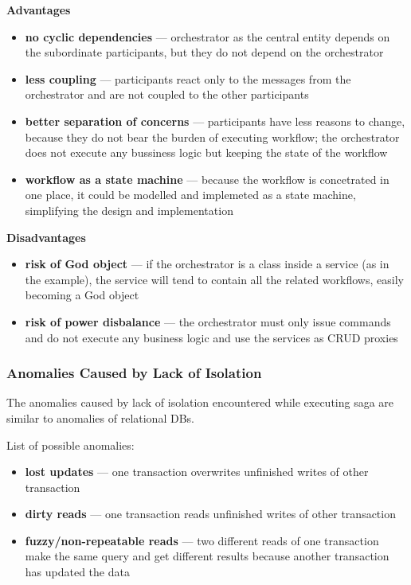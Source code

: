 \documentclass[thesis=M,english,hidelinks]{FITthesis}[2012/10/20]
\begin{document}
\vspace{1em}
\noindent
\textbf{Advantages}
\begin{itemize}
    \item \textbf{no cyclic dependencies} --- orchestrator as the central entity depends on the subordinate participants, but they do not depend on the orchestrator
    \item \textbf{less coupling} --- participants react only to the messages from the orchestrator and are not coupled to the other participants
    \item \textbf{better separation of concerns} --- participants have less reasons to change, because they do not bear the burden of executing workflow; the orchestrator does not execute any bussiness logic but keeping the state of the workflow
    \item \textbf{workflow as a state machine} --- because the workflow is concetrated in one place, it could be modelled and implemeted as a state machine, simplifying the design and implementation
\end{itemize}

\noindent
\textbf{Disadvantages}
\begin{itemize}
    \item \textbf{risk of God object} --- if the orchestrator is a class inside a service (as in the example), the service will tend to contain all the related workflows, easily becoming a God object~\cite{wiki-god-object}
    \item \textbf{risk of power disbalance} --- the orchestrator must only issue commands and do not execute any business logic and use the services as \acrshort{CRUD} proxies
\end{itemize}

\subsubsection{Anomalies Caused by Lack of Isolation}
The anomalies caused by lack of isolation encountered while executing saga are similar to anomalies of relational \acrshort{DB}s. 

\vspace{1em}
\noindent
List of possible anomalies:
\begin{itemize}
    \item \textbf{lost updates} --- one transaction overwrites unfinished writes of other transaction
    \item \textbf{dirty reads} --- one transaction reads unfinished writes of other transaction
    \item \textbf{fuzzy/non-repeatable reads} --- two different reads of one transaction make the same query and get different results because another transaction has updated the data
\end{itemize}
\end{document}
